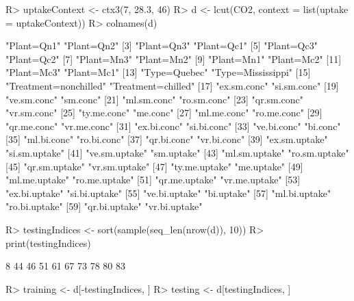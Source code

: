 \documentclass{article}\usepackage[]{graphicx}\usepackage[]{color}
\begin{document}
\begin{Schunk}
% --begin: "pbld2"
\begin{Sinput}
R> uptakeContext <- ctx3(7, 28.3, 46)
R> d <- lcut(CO2, context = list(uptake = uptakeContext))
R> colnames(d)
\end{Sinput}
\begin{Soutput}
 [1] "Plant=Qn1"            "Plant=Qn2"           
 [3] "Plant=Qn3"            "Plant=Qc1"           
 [5] "Plant=Qc3"            "Plant=Qc2"           
 [7] "Plant=Mn3"            "Plant=Mn2"           
 [9] "Plant=Mn1"            "Plant=Mc2"           
[11] "Plant=Mc3"            "Plant=Mc1"           
[13] "Type=Quebec"          "Type=Mississippi"    
[15] "Treatment=nonchilled" "Treatment=chilled"   
[17] "ex.sm.conc"           "si.sm.conc"          
[19] "ve.sm.conc"           "sm.conc"             
[21] "ml.sm.conc"           "ro.sm.conc"          
[23] "qr.sm.conc"           "vr.sm.conc"          
[25] "ty.me.conc"           "me.conc"             
[27] "ml.me.conc"           "ro.me.conc"          
[29] "qr.me.conc"           "vr.me.conc"          
[31] "ex.bi.conc"           "si.bi.conc"          
[33] "ve.bi.conc"           "bi.conc"             
[35] "ml.bi.conc"           "ro.bi.conc"          
[37] "qr.bi.conc"           "vr.bi.conc"          
[39] "ex.sm.uptake"         "si.sm.uptake"        
[41] "ve.sm.uptake"         "sm.uptake"           
[43] "ml.sm.uptake"         "ro.sm.uptake"        
[45] "qr.sm.uptake"         "vr.sm.uptake"        
[47] "ty.me.uptake"         "me.uptake"           
[49] "ml.me.uptake"         "ro.me.uptake"        
[51] "qr.me.uptake"         "vr.me.uptake"        
[53] "ex.bi.uptake"         "si.bi.uptake"        
[55] "ve.bi.uptake"         "bi.uptake"           
[57] "ml.bi.uptake"         "ro.bi.uptake"        
[59] "qr.bi.uptake"         "vr.bi.uptake"        
\end{Soutput}
%
% --end: "pbld2"
\end{Schunk}

\begin{Schunk}
% --begin: "pbld3"
\begin{Sinput}
R> testingIndices <- sort(sample(seq_len(nrow(d)), 10))
R> print(testingIndices)
\end{Sinput}
\begin{Soutput}
 [1]  8 44 46 51 61 67 73 78 80 83
\end{Soutput}
\begin{Sinput}
R> training <- d[-testingIndices, ]
R> testing <- d[testingIndices, ]
\end{Sinput}
%
% --end: "pbld3"
\end{Schunk}
\end{document}
